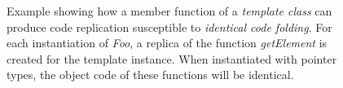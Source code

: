 \begin{figure}[h]



\caption{Example showing how a member function of a \textit{template class}
  can produce code replication susceptible to \textit{identical code folding}.
  For each instantiation of \textit{Foo}, a replica of the function
  \textit{getElement} is created for the template instance.
  When instantiated with pointer types, the object code of these functions will be identical.}
\label{fig:icf-example}
\end{figure}

